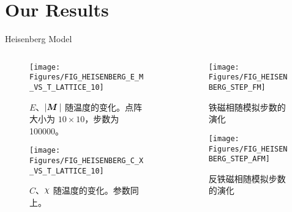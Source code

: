 \documentclass[UTF8, aspectratio = 43]{beamer}
\begin{document}
	\section{Our Results}
		\begin{frame}{Heisenberg Model}
			\begin{columns}
				\begin{column}{0.47\textwidth}
					\begin{figure}
						\texttt{[image: Figures/FIG\_HEISENBERG\_E\_M\_VS\_T\_LATTICE\_10]}
						\caption{$E$、$\left\lvert \bm{M}\, \right\rvert$ 随温度的变化。点阵大小为 $10\times10$，步数为 \num{100000}。}
					\end{figure} \pause
					\vspace{-1cm}
					\begin{figure}
						\texttt{[image: Figures/FIG\_HEISENBERG\_C\_X\_VS\_T\_LATTICE\_10]}
						\caption{$C$、$\c$ 随温度的变化。参数同上。}
					\end{figure}
				\end{column} \pause
				\begin{column}{0.53\textwidth}
					\begin{figure}
						\texttt{[image: Figures/FIG\_HEISENBERG\_STEP\_FM]}
						\caption{铁磁相随模拟步数的演化}
					\end{figure} \pause
					\vspace{-1cm}
					\begin{figure}
						\texttt{[image: Figures/FIG\_HEISENBERG\_STEP\_AFM]}
						\caption{反铁磁相随模拟步数的演化}
					\end{figure}
				\end{column}
			\end{columns}
		\end{frame}
		
\end{document}
